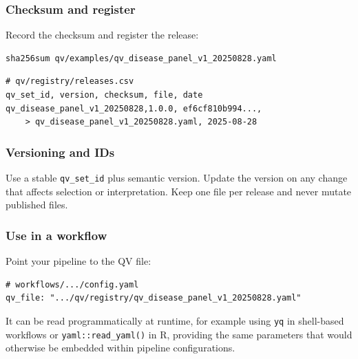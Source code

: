 \subsubsection*{Checksum and register}

Record the checksum and  register the release:

\begin{verbatim}
sha256sum qv/examples/qv_disease_panel_v1_20250828.yaml
\end{verbatim}

\begin{verbatim}
# qv/registry/releases.csv
qv_set_id, version, checksum, file, date
qv_disease_panel_v1_20250828,1.0.0, ef6cf810b994..., 
    > qv_disease_panel_v1_20250828.yaml, 2025-08-28
\end{verbatim}

\subsubsection*{Versioning and IDs}
Use a stable \texttt{qv\_set\_id} plus semantic version.  
Update the version on any change that affects selection or interpretation.  
Keep one file per release and never mutate published files.

\subsubsection*{Use in a workflow}
Point your pipeline to the QV file:
\begin{verbatim}
# workflows/.../config.yaml
qv_file: ".../qv/registry/qv_disease_panel_v1_20250828.yaml"
\end{verbatim}

It can be read programmatically at runtime, for example using \texttt{yq} in shell-based workflows or \texttt{yaml::read\_yaml()} in R, providing the same parameters that would otherwise be embedded within pipeline configurations.


